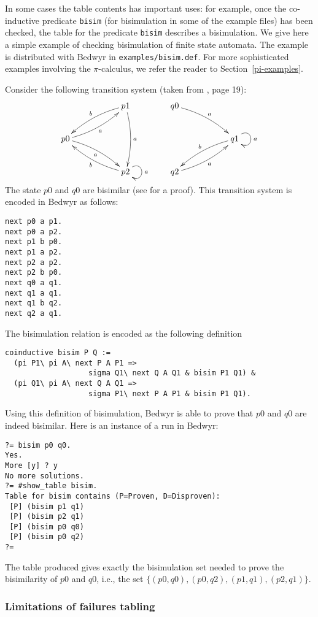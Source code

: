 \documentclass{article}
\begin{document}
In some cases the table contents has important uses: for
example, once the co-inductive predicate {\tt bisim} (for bisimulation
in some of the example files) has been checked, the table for the
predicate {\tt bisim} describes a bisimulation.
We give here a simple example of checking bisimulation of finite
state automata.
The example is distributed with Bedwyr in \verb+examples/bisim.def+.
For more sophisticated examples involving the $\pi$-calculus,
we refer the reader to Section~\ref{pi-examples}.

Consider the following transition system (taken from \cite{milner99book},
page 19):
$$
\xymatrix{
   &  & p1 \ar@/_/[lld]_b \ar@/^/[dd]^a \\
p0 \ar@/_/[rru]_a \ar@/^/[rrd]_a \\
 & & p2 \ar@(ur,dr)^a \ar@/^/[llu]^b
}
\qquad
\xymatrix{
q0 \ar@/^/[rrd]^a \\
 & & q1 \ar@(ur,dr)^a \ar@/_/[dll]_b \\
q2 \ar@/_/[rru]_a
}
$$
The state $p0$ and $q0$ are bisimilar (see \cite{milner99book} for a proof).
This transition system is encoded in Bedwyr as follows:
\begin{verbatim}
next p0 a p1.
next p0 a p2.
next p1 b p0.
next p1 a p2.
next p2 a p2.
next p2 b p0.
next q0 a q1.
next q1 a q1.
next q1 b q2.
next q2 a q1.
\end{verbatim}
The bisimulation relation is encoded as the following definition
\begin{verbatim}
coinductive bisim P Q :=
  (pi P1\ pi A\ next P A P1 =>
                   sigma Q1\ next Q A Q1 & bisim P1 Q1) &
  (pi Q1\ pi A\ next Q A Q1 =>
                   sigma P1\ next P A P1 & bisim P1 Q1).
\end{verbatim}
Using this definition of bisimulation, Bedwyr is able to prove that
$p0$ and $q0$ are indeed bisimilar. Here is an instance of a run in Bedwyr:
\begin{verbatim}
?= bisim p0 q0.
Yes.
More [y] ? y
No more solutions.
?= #show_table bisim.
Table for bisim contains (P=Proven, D=Disproven):
 [P] (bisim p1 q1)
 [P] (bisim p2 q1)
 [P] (bisim p0 q0)
 [P] (bisim p0 q2)
?=
\end{verbatim}
The table produced gives exactly the bisimulation set
needed to prove the bisimilarity of $p0$ and $q0$, i.e.,
the set $\{(p0,q0), (p0, q2), (p1,q1), (p2,q1) \}.$

\subsubsection{Limitations of failures tabling}
\label{restrict-failures-tabling}
\end{document}
